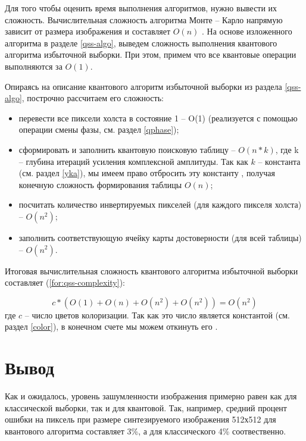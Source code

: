 Для того чтобы оценить время выполнения алгоритмов, нужно вывести их сложность. Вычислительная сложность алгоритма Монте -- Карло напрямую зависит от размера изображения и составляет $O(n)$ \cite{mc-complexity}. На основе изложенного алгоритма в разделе \ref{qss-algo}, выведем сложность выполнения квантового алгоритма избыточной выборки. При этом, примем что все квантовые операции выполняются за $O(1)$. 

Опираясь на описание квантового алгоритм избыточной выборки из раздела \ref{qss-algo}, построчно рассчитаем его сложность:

\begin{itemize}
	\item перевести все пиксели холста в состояние 1 -- O(1) (реализуется с помощью операции смены фазы, см. раздел \ref{qphase});
	\item сформировать и заполнить квантовую поисковую таблицу -- $O(n * k)$, где k -- глубина итераций усиления комплексной амплитуды. Так как $k$ -- константа (см. раздел \ref{yka}), мы имеем право отбросить эту константу \cite{computation-complexity}, получая конечную сложность формирования таблицы $O(n)$;
	\item посчитать количество инвертируемых пикселей (для каждого пикселя холста) -- $O(n^2)$;
	\item заполнить соответствующую ячейку карты достоверности (для всей таблицы) -- $O(n^2)$.
\end{itemize}

Итоговая вычислительная сложность квантового алгоритма избыточной выборки составляет (\ref{for:qss-complexity}):

\begin{equation}
	\label{for:qss-complexity}
	c * (O(1) + O(n) + O(n^2) + O(n^2)) = O(n^2)
\end{equation}
где $c$ -- число цветов колоризации. Так как это число является константой (см. раздел \ref{color}), в конечном счете мы можем откинуть его \cite{computation-complexity}.

\section*{Вывод}

Как и ожидалось, уровень зашумленности изображения примерно равен как для классической выборки, так и для квантовой. Так, например, средний процент ошибки на пиксель при размере синтезируемого изображения 512х512 для квантового алгоритма составляет 3\%, а для классического 4\% соотвественно.

